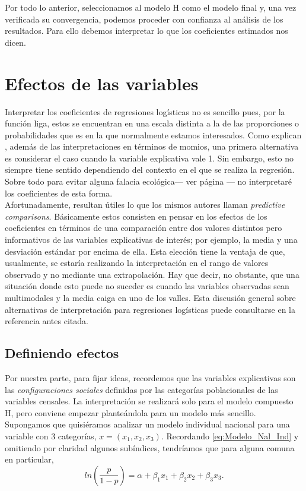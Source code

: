   Por todo lo anterior, seleccionamos al modelo H como el modelo final y, una vez verificada su convergencia, podemos proceder con confianza al análisis de los resultados. Para ello debemos interpretar lo que los coeficientes estimados nos dicen. 
  
\section{Efectos de las variables}

Interpretar los coeficientes de regresiones logísticas no es sencillo pues, por la función liga, estos se encuentran en una escala distinta a la de las proporciones o probabilidades que es en la que normalmente estamos interesados. Como explican \textcite{GelmanHill06}, además de las interpretaciones en términos de momios, una primera alternativa es considerar el caso cuando la variable explicativa vale 1. Sin embargo, esto no siempre tiene sentido dependiendo del contexto en el que se realiza la regresión. Sobre todo para evitar alguna falacia ecológica--- ver página \pageref{No_Extrapolar}--- no interpretaré los coeficientes de esta forma.\\ 

 Afortunadamente, resultan útiles lo que los mismos autores llaman \textit{predictive comparisons}. Básicamente estos consisten en pensar en los efectos de los coeficientes en términos de una comparación entre dos valores distintos pero informativos de las variables explicativas de interés; por ejemplo, la media y una desviación estándar por encima de ella. Esta elección tiene la ventaja de que, usualmente, se estaría realizando la interpretación en el rango de valores observado y no mediante una extrapolación. Hay que decir, no obstante, que una situación donde esto puede no suceder es cuando las variables observadas sean multimodales y la media caiga en uno de los valles. Esta discusión general sobre alternativas de interpretación para regresiones logísticas puede consultarse en la referencia antes citada.
 
\subsection{Definiendo efectos}

 Por nuestra parte, para fijar ideas, recordemos que las variables explicativas son las \textit{configuraciones sociales} definidas por las categorías poblacionales de las variables censales. La interpretación se realizará solo para el modelo compuesto H, pero conviene empezar planteándola para un modelo más sencillo. Supongamos que quisiéramos analizar un modelo individual nacional para una variable con 3 categorías, $x = (x_1,x_2,x_3)$. Recordando \eqref{eq:Modelo_Nal_Ind} y omitiendo por claridad algunos subíndices, tendríamos que para alguna comuna en particular,
\begin{equation*}
ln\left(\dfrac{p}{1-p}\right) = \alpha + \beta_1 x_1 + \beta_2 x_2 + \beta_3 x_3.
\end{equation*}

